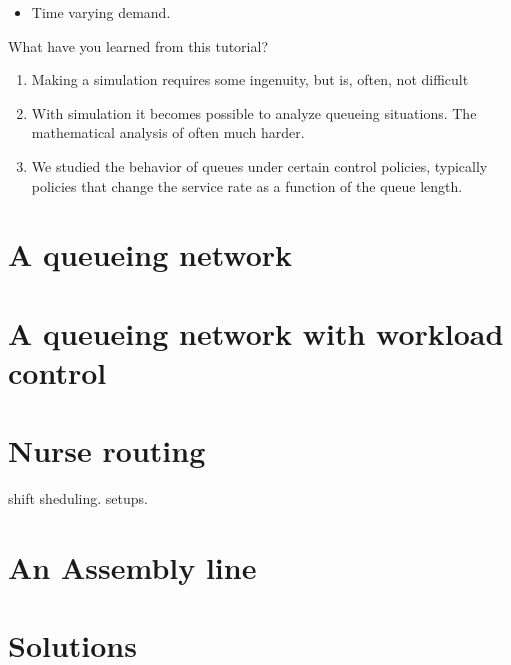 \documentclass{scrartcl}
\begin{document}
\begin{itemize}
\item Time varying demand.
\end{itemize}


\begin{exercise}
  What have you learned from this tutorial?
  \begin{solution}
    \begin{enumerate}
    \item  Making a  simulation requires some ingenuity, but is, often, not difficult
    \item With simulation it becomes possible to analyze queueing situations. The mathematical analysis of often much harder. 
    \item We studied the behavior of queues under certain control policies, typically policies that change the service rate as a function of the queue length.
    \end{enumerate}
  \end{solution}
\end{exercise}

\clearpage

\section{A queueing network}
\label{sec:queueing-network}


\section{A queueing network with workload control}
\label{sec:queu-netw-with}




\section{Nurse routing}
\label{sec:nurse-routing}

shift sheduling. setups. 


\section{An Assembly line}
\label{sec:an-assembly-line}






\clearpage
\section*{Solutions}

\end{document}
